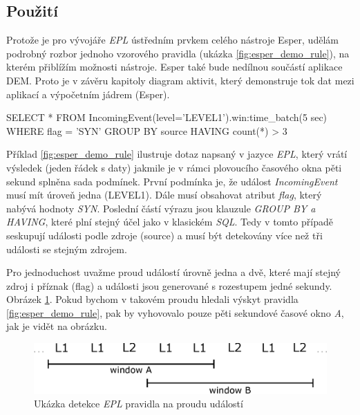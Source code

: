 \documentclass[
  digital, %
  table,   %
  nolof,     %
  nolot,     %
  oneside, %
  nocover,
  monochrome,
  12pt
]{fithesis3}
\begin{document}
\subsection*{Použití}
Protože je pro vývojáře \textit{EPL} ústředním prvkem celého nástroje Esper, udělám podrobný rozbor jednoho vzorového pravidla (ukázka \ref{fig:esper_demo_rule}), na kterém přiblížím možnosti nástroje. Esper také bude nedílnou součástí aplikace DEM. Proto je v závěru kapitoly diagram aktivit, který demonstruje tok dat mezi aplikací a výpočetním jádrem (Esper).

\begin{center}
\begin{minipage}[H]{\linewidth}
	\begin{mylisting}
SELECT * FROM
IncomingEvent(level='LEVEL1').win:time_batch(5 sec) WHERE
flag = 'SYN' GROUP BY source HAVING count(*) > 3
	\end{mylisting}
	\label{fig:esper_demo_rule} 
\end{minipage}
\end{center}

Příklad \ref{fig:esper_demo_rule} ilustruje dotaz napsaný v jazyce \textit{EPL}, který vrátí výsledek (jeden řádek s daty) jakmile je v rámci plovoucího časového okna pěti sekund splněna sada podmínek. První podmínka je, že událost \textit{IncomingEvent} musí mít úroveň jedna (LEVEL1). Dále musí obsahovat atribut \textit{flag}, který nabývá hodnoty \textit{SYN}. Poslední částí výrazu jsou klauzule \textit{GROUP BY a HAVING}, které plní stejný účel jako v klasickém \textit{SQL}. Tedy v tomto případě seskupují události podle zdroje (source) a musí být detekovány více než tři události se stejným zdrojem.

Pro jednoduchost uvažme proud událostí úrovně jedna a dvě, které mají stejný zdroj i příznak (flag) a události jsou generované s rozestupem jedné sekundy. Obrázek \ref{fig:esper_demo}. Pokud bychom v takovém proudu hledali výskyt pravidla \ref{fig:esper_demo_rule}, pak by vyhovovalo pouze pěti sekundové časové okno \textit{A}, jak je vidět na obrázku.

\begin{figure}[H]
	\centering
    \includegraphics[width=\linewidth, height=.13\textheight]{images/esper-demo.eps}
    \caption{Ukázka detekce \textit{EPL} pravidla na proudu událostí}
    \label{fig:esper_demo}
\end{figure}
\end{document}
